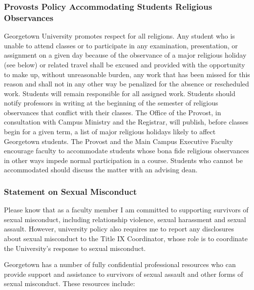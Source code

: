 \documentclass[
  12pt,
]{article}
\begin{document}
\hypertarget{provosts-policy-accommodating-students-religious-observances}{%
\subsubsection{Provosts Policy Accommodating Students Religious
Observances}\label{provosts-policy-accommodating-students-religious-observances}}

Georgetown University promotes respect for all religions. Any student
who is unable to attend classes or to participate in any examination,
presentation, or assignment on a given day because of the observance of
a major religious holiday (see below) or related travel shall be excused
and provided with the opportunity to make up, without unreasonable
burden, any work that has been missed for this reason and shall not in
any other way be penalized for the absence or rescheduled work. Students
will remain responsible for all assigned work. Students should notify
professors in writing at the beginning of the semester of religious
observances that conflict with their classes. The Office of the Provost,
in consultation with Campus Ministry and the Registrar, will publish,
before classes begin for a given term, a list of major religious
holidays likely to affect Georgetown students. The Provost and the Main
Campus Executive Faculty encourage faculty to accommodate students whose
bona fide religious observances in other ways impede normal
participation in a course. Students who cannot be accommodated should
discuss the matter with an advising dean.

\hypertarget{statement-on-sexual-misconduct}{%
\subsubsection{Statement on Sexual
Misconduct}\label{statement-on-sexual-misconduct}}

Please know that as a faculty member I am committed to supporting
survivors of sexual misconduct, including relationship violence, sexual
harassment and sexual assault. However, university policy also requires
me to report any disclosures about sexual misconduct to the Title IX
Coordinator, whose role is to coordinate the University's response to
sexual misconduct.

Georgetown has a number of fully confidential professional resources who
can provide support and assistance to survivors of sexual assault and
other forms of sexual misconduct. These resources include:
\end{document}
